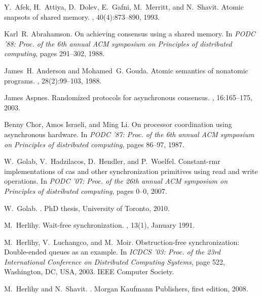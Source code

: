 \documentclass[11pt,letterpaper]{article}
\begin{document}
\newpage

\newcommand{\etalchar}[1]{$^{#1}$}
\begin{thebibliography}{GHHW07}

\bibitem[AAD{\etalchar{+}}93]{aadgms:snapshots}
Y.~Afek, H.~Attiya, D.~Dolev, E.~Gafni, M.~Merritt, and N.~Shavit.
\newblock Atomic snapsots of shared memory.
, 40(4):873--890, 1993.

Karl~R. Abrahamson.
\newblock On achieving consensus using a shared memory.
\newblock In {\em PODC '88: Proc. of the 6th annual ACM symposium on Principles
  of distributed computing}, pages 291--302, 1988.

James~H. Anderson and Mohamed~G. Gouda.
\newblock Atomic semantics of nonatomic programs.
, 28(2):99--103, 1988.

James Aspnes.
\newblock Randomized protocols for asynchronous consensus.
, 16:165--175, 2003.

Benny Chor, Amos Israeli, and Ming Li.
\newblock On processor coordination using asynchronous hardware.
\newblock In {\em PODC '87: Proc. of the 6th annual ACM symposium on Principles
  of distributed computing}, pages 86--97, 1987.

W.~Golab, V.~Hadzilacos, D.~Hendler, and P.~Woelfel.
\newblock Constant-rmr implementations of cas and other synchronization
  primitives using read and write operations.
\newblock In {\em PODC '07: Proc. of the 26th annual ACM symposium on
  Principles of distributed computing}, pages 0--0, 2007.

W.~Golab.
.
\newblock PhD thesis, University of Toronto, 2010.

M.~Herlihy.
\newblock Wait-free synchronization.
, 13(1), January 1991.

M.~Herlihy, V.~Luchangco, and M.~Moir.
\newblock Obstruction-free synchronization: Double-ended queues as an example.
\newblock In {\em ICDCS '03: Proc. of the 23rd International Conference on
  Distributed Computing Systems}, page 522, Washington, DC, USA, 2003. IEEE
  Computer Society.

M.~Herlihy and N.~Shavit.
.
\newblock Morgan Kaufmann Publishers, first edition, 2008.


\end{thebibliography}
\end{document}

